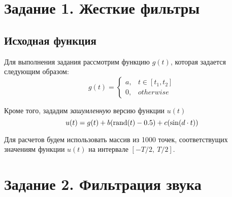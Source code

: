 \section{Задание 1. Жесткие фильтры}

\subsection{Исходная функция}

Для выполнения задания рассмотрим функцию $g(t)$, которая задается следующим образом: 
\begin{equation}
    g(t) = \begin{cases}
        a, & t \in [t_1, t_2]\\
        0, & otherwise
    \end{cases}
\end{equation}

Кроме того, зададим \textit{зашумленную} версию функции $u(t)$ 
\begin{equation}
    u(t) = g(t) + b(\operatorname{\text{rand}}(t) - 0.5) + c(\sin(d \cdot t))  
    \label{eq:noise}
\end{equation}

Для расчетов будем использовать массив из 1000 точек, соответствущих значениям функции $u(t)$ на интервале $[-T/2,~T/2]$.





\section{Задание 2. Фильтрация звука}

